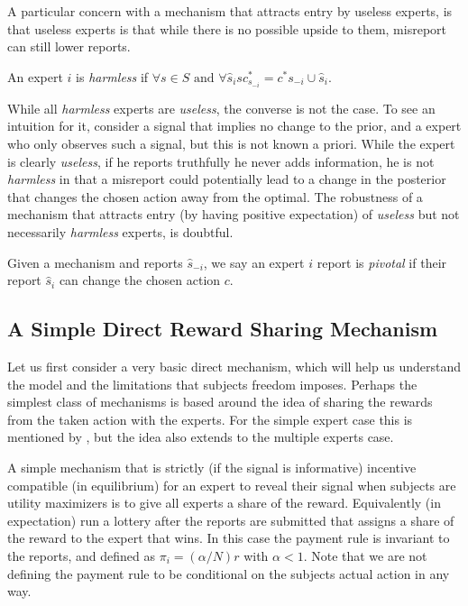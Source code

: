 A particular concern with a mechanism that attracts entry by useless experts, is that useless experts is that while there is no possible upside to them, misreport can still lower reports.

\begin{defn}\label{defn:harmless}
	An expert $i$ is \emph{harmless} if $\forall s \in S \text{ and }\forall \hat{s}_i s c^{*}_{s_{-i}} = c^{*}{s_{-i} \cup \hat{s}_i}$.
\end{defn}

While all \emph{harmless} experts are \emph{useless}, the converse is not the case. To see an intuition for it, consider a signal that implies no change to the prior, and a expert who only observes such a signal, but this is not known a priori. While the expert is clearly \emph{useless}, if he reports truthfully he never adds information, he is not \emph{harmless} in that a misreport could potentially lead to a change in the posterior that changes the chosen action away from the optimal.
The robustness of a mechanism that attracts entry (by having positive expectation) of \emph{useless} but not necessarily \emph{harmless}  experts, is doubtful.

\begin{defn}\label{defn:pivotal}
Given a mechanism and reports $\hat{s}_{-i}$, we say an expert $i$ report is \emph{pivotal} if their report $\hat{s}_i$ can change the chosen action $c$.
\end{defn}


\subsection{A Simple Direct Reward Sharing Mechanism}


Let us first consider a very basic direct mechanism, which will help us understand the model and the limitations that subjects freedom imposes. 
Perhaps the simplest class of mechanisms is based around the idea of sharing the rewards from the taken action with the experts. For the simple expert case this is mentioned by \cite{othman2010decision}, but the idea also extends to the multiple experts case. 

A simple mechanism that is strictly (if the signal is informative) incentive compatible (in equilibrium) for an expert to reveal their signal when subjects are utility maximizers is to give all experts a share of the reward. Equivalently (in expectation) run a lottery after the reports are submitted that assigns a share of the reward to the expert that wins. 
In this case the payment rule is invariant to the reports, and defined as $\pi_i  = (\alpha / N ) r $ with $\alpha < 1$. Note that we are not defining the payment rule to be conditional on the subjects actual action in any way. %

